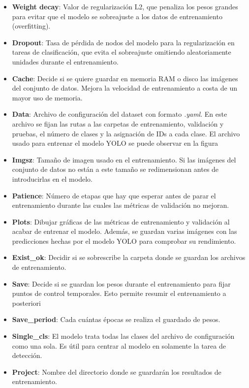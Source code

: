 \documentclass[11pt]{article}
\begin{document}
\begin{itemize}
    \item \textbf{Weight decay}: Valor de regularización L2, que penaliza los pesos grandes para evitar que el modelo se sobreajuste a los datos de entrenamiento (overfitting).

    \item \textbf{Dropout}: Tasa de pérdida de nodos del modelo para la regularización en tareas de clasificación, que evita el sobreajuste omitiendo aleatoriamente unidades durante el entrenamiento.

    \item \textbf{Cache}: Decide si se quiere guardar en memoria RAM o disco las imágenes del conjunto de datos. Mejora la velocidad de entrenamiento a costa de un mayor uso de memoria.

    \item \textbf{Data}: Archivo de configuración del dataset con formato \textit{.yaml}. En este archivo se fijan las rutas a las carpetas de entrenamiento, validación y pruebas, el número de clases y la asignación de IDs a cada clase. El archivo usado para entrenar el modelo YOLO se puede observar en la figura %

    \item \textbf{Imgsz}: Tamaño de imagen usado en el entrenamiento. Si las imágenes del conjunto de datos no están a este tamaño se redimensionan antes de introducirlas en el modelo.

    \item \textbf{Patience}: Número de etapas que hay que esperar antes de parar el entrenamiento durante las cuales las métricas de validación no mejoran.

    \item \textbf{Plots}: Dibujar gráficas de las métricas de entrenamiento y validación al acabar de entrenar el modelo. Además, se guardan varias imágenes con las predicciones hechas por el modelo YOLO para comprobar su rendimiento. 

    \item \textbf{Exist\_ok}: Decidir si se sobrescribe la carpeta donde se guardan los archivos de entrenamiento.
    
    \item \textbf{Save}: Decide si se guardan los pesos durante el entrenamiento para fijar puntos de control temporales. Esto permite resumir el entrenamiento a posteriori
    
    \item \textbf{Save\_period}: Cada cuántas épocas se realiza el guardado de pesos.

    \item \textbf{Single\_cls}: El modelo trata todas las clases del archivo de configuración como una sola. Es útil para centrar al modelo en solamente la tarea de detección.
    
    \item \textbf{Project}: Nombre del directorio donde se guardarán los resultados de entrenamiento.
\end{itemize}
\end{document}
